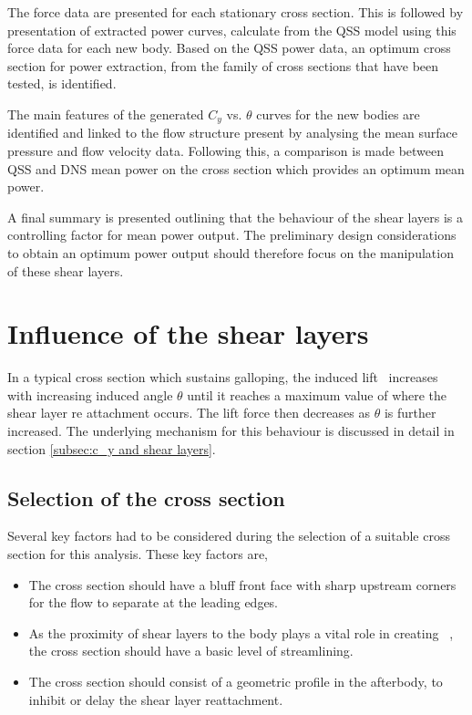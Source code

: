 The force data are presented for each stationary cross section. This is followed by presentation of extracted power curves, calculate from the QSS model using this force data for each new body. Based on the QSS power data, an optimum cross section for power extraction, from the family of cross sections that have been tested, is identified.

The main features of the generated $C_y$ vs. $\theta$ curves for the
new bodies are identified and linked to the flow structure present by
analysing the mean surface pressure and flow velocity data. Following
this, a comparison is made between QSS and DNS mean power on the cross
section which provides an optimum mean power.

A final summary is presented outlining that the behaviour of the shear layers is a controlling factor for mean power output. The preliminary design considerations to obtain an optimum power output should therefore focus on the manipulation of these shear layers. 





\section{Influence of the shear layers}

In a typical cross section which sustains galloping, the induced lift \cy\ increases with increasing induced angle $\theta$ until it reaches a maximum value of \cy where the shear layer re attachment occurs. The lift force then decreases as $\theta$ is further increased. The underlying mechanism for this behaviour is discussed in detail in section \ref{subsec:c_y and shear layers}.   

\subsection*{Selection of the cross section}



Several key factors had to be considered during the selection of a suitable cross section for this analysis. These key factors are,

\begin{itemize}
\item The cross section should have a bluff front face with sharp upstream corners for the flow to separate at the leading edges.

\item As the proximity of shear layers to the body plays a vital role in creating \cy\ \citet{Parkinson1989}, the cross section should have a basic level of streamlining.

\item The cross section should consist of a geometric profile in the afterbody, to inhibit or delay the shear layer reattachment.   
\end{itemize}

